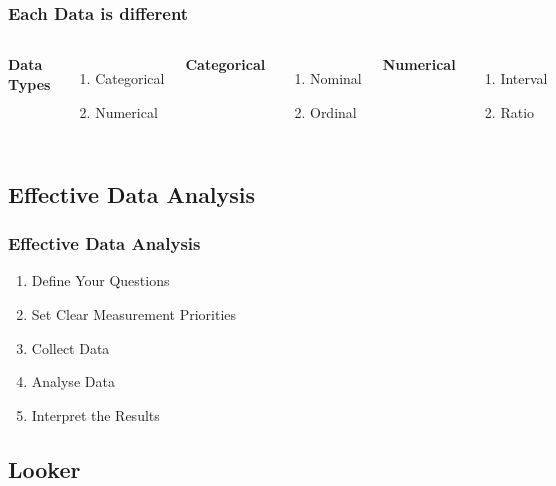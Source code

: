 \documentclass{beamer}
\begin{document}
\begin{frame}
\frametitle{Each Data is different}
\begin{columns}[c] %

\textbf{Data Types}
\begin{enumerate}
\item Categorical
\item Numerical
\end{enumerate}

\textbf{Categorical}
\begin{enumerate}
\item Nominal
\item Ordinal
\end{enumerate}

\textbf{Numerical}
\begin{enumerate}
\item Interval
\item Ratio
\end{enumerate}

\end{columns}
\end{frame}

\subsection{Effective Data Analysis}
\begin{frame}
\frametitle{Effective Data Analysis}
\begin{enumerate}
\item<1-> Define Your Questions
\item<2-> Set Clear Measurement Priorities
\item<3-> Collect Data
\item<4-> Analyse Data
\item<4-> Interpret the Results
\end{enumerate}
\end{frame}

\subsection{Looker}
\end{document}

